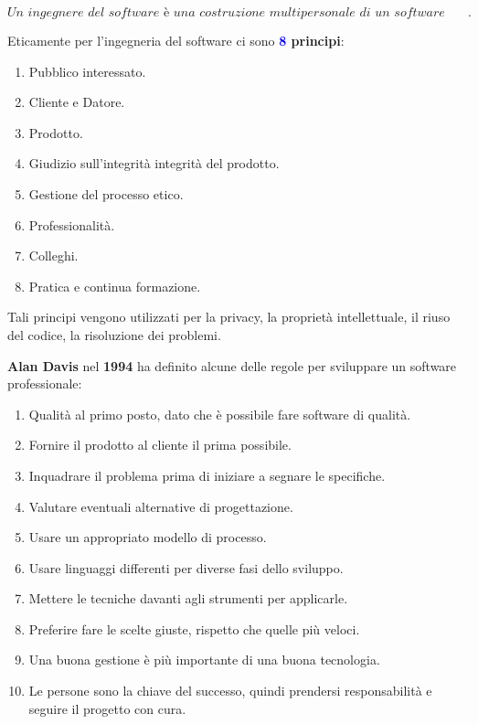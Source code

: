 \[
\textit{Un ingegnere del software è una costruzione multipersonale di un software multi versione}.
\]

Eticamente per l'ingegneria del software ci sono \textbf{\textcolor{blue}{8} principi}:
\begin{enumerate}
    \item Pubblico interessato.
    \item Cliente e Datore.
    \item Prodotto.
    \item Giudizio sull'integrità integrità del prodotto.
    \item Gestione del processo etico.
    \item Professionalità.
    \item Colleghi.
    \item Pratica e continua formazione.
\end{enumerate}
Tali principi vengono utilizzati per la privacy, la proprietà
intellettuale, il riuso del codice, la risoluzione dei problemi.

\vspace*{0.02\textheight}
\textbf{Alan Davis} nel \textbf{1994} ha definito alcune delle regole per sviluppare un software professionale:
\begin{enumerate}
    \item Qualità al primo posto, dato che è possibile fare software di qualità.
    \item Fornire il prodotto al cliente il prima possibile.
    \item Inquadrare il problema prima di iniziare a segnare le specifiche.
    \item Valutare eventuali alternative di progettazione.
    \item Usare un appropriato modello di processo.
    \item Usare linguaggi differenti per diverse fasi dello sviluppo.
    \item Mettere le tecniche davanti agli strumenti per applicarle.
    \item Preferire fare le scelte giuste, rispetto che quelle più veloci.
    \item Una buona gestione è più importante di una buona tecnologia.
    \item Le persone sono la chiave del successo, quindi prendersi responsabilità e seguire il progetto con cura.
\end{enumerate}

